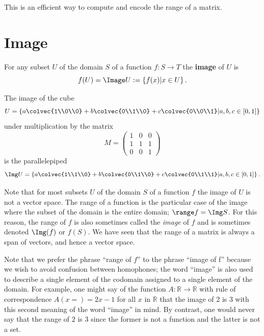 \noindent
This is an efficient way to compute and encode the range of a matrix.

\section{Image} 

\begin{definition}
For any subset $U$ of the domain $S$ of a function $f:S\to T$  the {\bfseries image} of $U$ is 
\[f(U)=\Image U:= \left\{  f(x) | x\in U \right\} .\]
\end{definition}

\begin{example} 
The image of the  cube
\[U= \left\{  a \colvec{1\\0\\0} +b \colvec{0\\1\\0}+c\colvec{0\\0\\1} \middle| a,b,c \in [0,1] \right\} \] 
under multiplication by the matrix 
\[ M=
\begin{pmatrix}
1&0&0\\
1&1&1\\
0&0&1
\end{pmatrix}
\]
is the parallelepiped 
\[
\Img U= 
 \left\{  a \colvec{1\\1\\0} +b \colvec{0\\1\\0}+c\colvec{0\\1\\1} \middle| a,b,c \in [0,1] \right\} .
\]
\end{example}

Note that for most subsets $U$ of the domain $S$  of a function  $f$ the image of $U$ is not a vector space. 
The range of a function is the particular case of the image where the subset of the domain is the entire domain; $\range  f = \Img S$. 
For this reason, the range of $f$ is also sometimes called the \emph{image} of $f$ and is sometimes denoted $\Img(f)$ or  $f(S).$  We have seen that the range of a matrix is always a span of vectors, and hence a vector space. 

Note that we prefer the phrase ``range of $f$'' to the phrase ``image of f''  
because we wish to avoid confusion between homophones;
 the word 
``image'' is also used to describe a single element of the codomain assigned to a single element of the domain. 
For example, 
one might say of 
the function $A:\mathbb{R}\to\mathbb{R}$ with rule of correspondence $A(x=)=2x-1$ for all $x$ in $\mathbb{R}$ that the image of $2$ is $3$ with this second meaning of the word ``image'' in mind. 
By contrast, one would never say that the range of $2$ is $3$ since the former is not a function and the latter is not a set.


